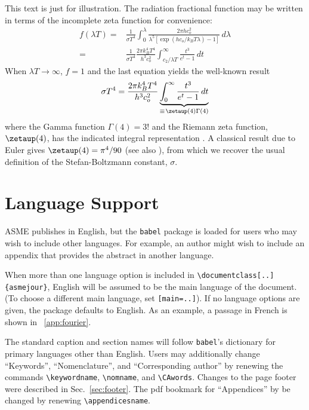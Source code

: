 \documentclass[subscriptcorrection,upint,varvw,barcolor=Goldenrod3,mathalfa=cal=euler,balance,hyphenate,french,pdf-a]{asmejour} %
\begin{document}
This text is just for illustration. The radiation fractional function may be written in terms of the incomplete zeta function for convenience:
\begin{align}
f(\lambda T)  = {}&  \frac{1}{\sigma T^4} \int_0^\lambda\frac{2\pi h c_o^2}{\lambda^5 \left[ \exp (h c_o/k_B T \lambda) - 1\right] } \, d\lambda \\
 = {}&  \frac{1}{\sigma T^4}\frac{2\pi k_B^4 T^4}{h^3c_o^2}\int^\infty_{c_2/\lambda T}\frac{t^3}{e^t -1}\, dt\label{eqn:zeta}
\end{align}
When $\lambda T \rightarrow \infty$, $f = 1$ and the last equation yields the well-known result
\begin{equation}
 {\sigma T^4} =\frac{2\pi k_B^4 T^4}{h^3c_o^2} \underbrace{\int_0^\infty \frac{t^3}{e^t - 1} \, dt}_{\equiv\mspace{2mu} \zetaup(4)\Gamma(4)} 
\end{equation}
where the Gamma function $\Gamma(4) = 3!$ and the Riemann zeta function, $\zetaup(4)$, has the indicated integral representation \cite[\S13.12]{ww1927}.  A classical result due to Euler \cite{euler1740} gives $\zetaup(4) = \pi^4/90$ (see also \cite[\S167]{euler1748}), from which we recover the usual definition of the  Stefan-Boltzmann constant, $\sigma$. 


\section{Language Support}

ASME publishes in English, but the \texttt{babel} package is loaded for users who may wish to include other languages. 
For example, an author might wish to include an appendix that provides the abstract in another language.

When more than one language option is included in \verb|\documentclass[..]{asmejour}|, English will be 
assumed to be the main language of the document. (To choose a different main language, set \texttt{[main=..]}).
If no language options are given, the package defaults to English.  As an example, a passage in French is 
shown in \appendixname~\ref{app:fourier}.

The standard caption and section names will follow \texttt{babel}'s dictionary for primary languages other than English.  Users may additionally change ``Keywords'', ``Nomenclature'', and  ``Corresponding author'' by renewing the commands \verb|\keywordname|, \verb|\nomname|, and \verb|\CAwords|. Changes to the page footer were described in Sec.~\ref{sec:footer}. The pdf bookmark for ``Appendices'' by be changed by renewing \verb|\appendicesname|.
\end{document}
